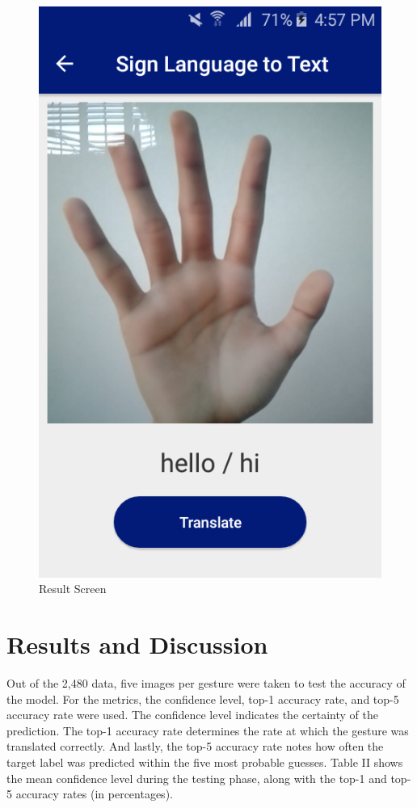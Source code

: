 \documentclass[journal]{./IEEE/IEEEtran}
\begin{document}
\begin{figure}[ht!]
    \centering
    \includegraphics[width=0.75\linewidth]{./images/screen_stt_result.png}
    \caption{Result Screen}
    \label{fig:stt_result}
\end{figure}

\section{Results and Discussion}

Out of the 2,480 data, five images per gesture were taken to test the accuracy of the model. For the metrics, the confidence level, top-1 accuracy rate, and top-5 accuracy rate were used. 
\newline
\indent The confidence level indicates the certainty of the prediction. The top-1 accuracy rate determines the rate at which the gesture was translated correctly. And lastly, the top-5 accuracy rate notes how often the target label was predicted within the five most probable guesses.
\newline
\indent Table II shows the mean confidence level during the testing phase, along with the top-1 and top-5 accuracy rates (in percentages).
\end{document}
